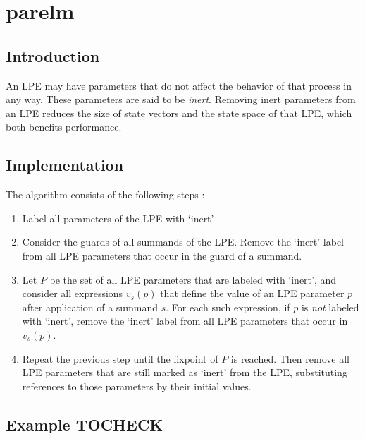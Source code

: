 \chapter{parelm}

\section{Introduction}

An LPE may have parameters that do not affect the behavior of that process in any way.
These parameters are said to be \emph{inert}.
Removing inert parameters from an LPE reduces the size of state vectors and the state space of that LPE, which both benefits performance.

\section{Implementation}

The algorithm consists of the following steps \cite{groote2001computer}:

\begin{enumerate}

\item Label all parameters of the LPE with `inert'.

\item Consider the guards of all summands of the LPE.
Remove the `inert' label from all LPE parameters that occur in the guard of a summand.

\item Let $P$ be the set of all LPE parameters that are labeled with `inert', and consider all expressions $v_s(p)$ that define the value of an LPE parameter $p$ after application of a summand $s$.
For each such expression, if $p$ is \emph{not} labeled with `inert', remove the `inert' label from all LPE parameters that occur in $v_s(p)$.

\item Repeat the previous step until the fixpoint of $P$ is reached.
Then remove all LPE parameters that are still marked as `inert' from the LPE, substituting references to those parameters by their initial values.

\end{enumerate}

\clearpage
\section{Example TOCHECK}

